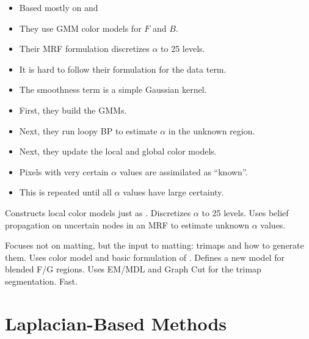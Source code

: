 \documentclass{beamer}
\begin{document}
\begin{frame}[allowframebreaks]{\cite{wang2005iterative}}
 \begin{itemize}
  \item Based mostly on \cite{chuang2001bayesian} and \cite{rother2004grabcut}
  \item They use GMM color models for $F$ and $B$.
  \item Their MRF formulation discretizes $\alpha$ to 25 levels.
  \item It is hard to follow their formulation for the data term.
  \item The smoothness term is a simple Gaussian kernel.
  \item First, they build the GMMs.
  \item Next, they run loopy BP to estimate $\alpha$ in the unknown region.
  \item Next, they update the local and global color models.
  \item Pixels with very certain $\alpha$ values are assimilated as ``known''.
  \item This is repeated until all $\alpha$ values have large certainty.
 \end{itemize}

 Constructs local color models just as \cite{chuang2001bayesian}.
 Discretizes $\alpha$ to 25 levels.
 Uses belief propagation on uncertain nodes in an MRF to estimate unknown $\alpha$ values.
\end{frame}

\begin{frame}[allowframebreaks]{\cite{juan2005trimap}}
 Focuses not on matting, but the input to matting: trimaps and how to generate them.
 Uses color model and basic formulation of \cite{rother2004grabcut}.
 Defines a new model for blended F/G regions.
 Uses EM/MDL and Graph Cut for the trimap segmentation.
 Fast.
\end{frame}

\section{Laplacian-Based Methods}%
\end{document}
